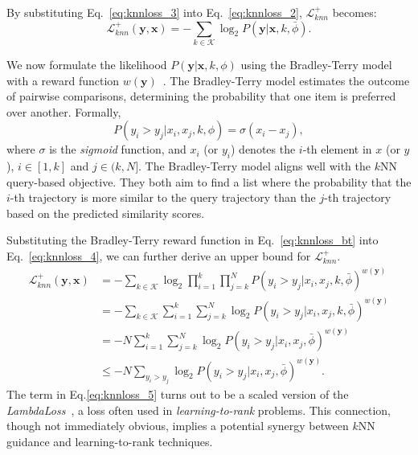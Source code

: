 By substituting Eq.~\eqref{eq:knnloss_3} into Eq.~\eqref{eq:knnloss_2}, $\mathcal{L}_{knn}^{+}$ becomes: 
{\small
\begin{equation}\label{eq:knnloss_4}
    \mathcal{L}_{knn}^{+}(\mathbf{y}, \mathbf{x})  = -\sum_{k \in \mathcal{K}} \log_2  P(\mathbf{y} | \mathbf{x}, k, \bar{\phi}).
\end{equation}
}

We now formulate the likelihood $P(\mathbf{y} | \mathbf{x}, k, \phi)$ using the  Bradley-Terry model with a reward function $w(\mathbf{y})$~\cite{bradleyterry}.
The Bradley-Terry model estimates the outcome of pairwise comparisons, determining the probability that one item is preferred over another. Formally, 
{\small
\begin{equation}\label{eq:knnloss_bt}
P(y_i > y_j | x_i, x_j, k, \phi) = \sigma(x_i - x_j),
\end{equation}
}
where $\sigma$ is the \emph{sigmoid} function, and $x_i$ (or $y_i$) denotes the $i$-th element in $x$ (or $y$), $i \in [1, k]$ and $j \in (k, N]$. The Bradley-Terry model aligns well with the $k$NN query-based objective. They both aim to find a list where  the probability that the $i$-th trajectory is more similar to the query trajectory than the $j$-th trajectory based on the predicted similarity scores. 


Substituting the Bradley-Terry reward function in Eq.~\eqref{eq:knnloss_bt} into Eq.~\eqref{eq:knnloss_4}, we can further derive an upper bound for $\mathcal{L}_{knn}^{+}$.
{\small
\begin{align}
    \mathcal{L}_{knn}^{+}(\mathbf{y}, \mathbf{x}) & = -\sum_{k \in \mathcal{K}} \log_{2} \prod_{i = 1}^{k} \prod_{j = k}^{N} P(y_i > y_j | x_i, x_j, k, \bar{\phi})^{w(\mathbf{y})} \nonumber\\
    & = -\sum_{k \in \mathcal{K}} \sum_{i = 1}^{k} \sum_{j = k}^{N} \log_{2} P(y_i > y_j | x_i, x_j, k, \bar{\phi})^{w(\mathbf{y})} \nonumber\\
    & = -N \sum_{i = 1}^{k} \sum_{j = k}^{N} \log_{2} P(y_i > y_j | x_i, x_j,  \bar{\phi})^{w(\mathbf{y})} \label{eq:knnloss_5_1}\\
    & \leqslant -N\sum_{y_i > y_j} \log_{2} P(y_i > y_j | x_i, x_j, \bar{\phi})^{w(\mathbf{y})}. \label{eq:knnloss_5}
\end{align}}
The term in Eq.\eqref{eq:knnloss_5} turns out to be a scaled version of the \emph{LambdaLoss}~\cite{lambdaloss}, a  loss  often used in \emph{learning-to-rank} problems. This connection, though not immediately obvious, implies a potential synergy between $k$NN guidance and learning-to-rank techniques.

